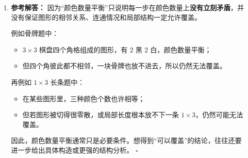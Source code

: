 \documentclass[11pt,a4paper,fontset=fandol]{ctexart}
\newenvironment{solution}{\par\noindent\textbf{参考解答：}}{\hfill$\square$\par}
\begin{document}
\begin{enumerate}
\begin{solution}
  但整个棋盘都变成白色时，黑格数是 $0$，为偶数。矛盾。

  因此不可能把整个棋盘都变成白色。
  \end{solution}

  \item \begin{solution}
  因为“颜色数量平衡”只说明每一步在颜色数量上\textbf{没有立刻矛盾}，并没有保证图形的相邻关系、连通情况和局部结构一定允许覆盖。

  例如骨牌题中：
  \begin{itemize}
    \item $3\times 3$ 棋盘四个角格组成的图形，有 $2$ 黑 $2$ 白，颜色数量平衡；
    \item 但四个角彼此都不相邻，一块骨牌也放不进去，所以仍然无法覆盖。
  \end{itemize}

  再例如 $1\times 3$ 长条题中：
  \begin{itemize}
    \item 在某些图形里，三种颜色个数也许相等；
    \item 但若图形被切得很零散，或局部长度根本放不下一条 $1\times 3$，仍然可能无法覆盖。
  \end{itemize}

  因此，颜色数量平衡通常只是必要条件。想得到“可以覆盖”的结论，往往还要进一步给出具体构造或更强的结构分析。
  \end{solution}
\end{enumerate}
\end{document}
